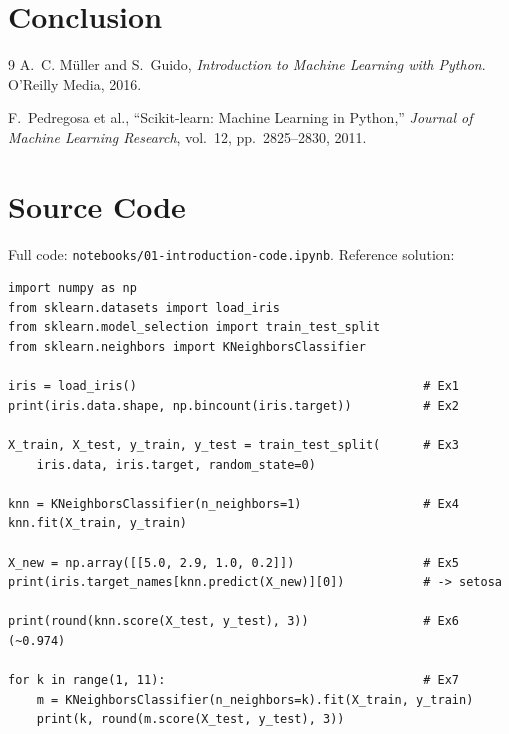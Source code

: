 \documentclass[11pt,a4paper]{article}
\begin{document}
\section{Conclusion}

\begin{thebibliography}{9}
A.~C. M\"uller and S.~Guido,
\emph{Introduction to Machine Learning with Python}.
O'Reilly Media, 2016.

F.~Pedregosa et al.,
``Scikit-learn: Machine Learning in Python,''
\emph{Journal of Machine Learning Research}, vol.~12, pp.~2825--2830, 2011.
\end{thebibliography}

\appendix
\section{Source Code}
Full code: \texttt{notebooks/01-introduction-code.ipynb}. Reference solution:

\begin{lstlisting}[caption={End-to-end reference solution.}]
import numpy as np
from sklearn.datasets import load_iris
from sklearn.model_selection import train_test_split
from sklearn.neighbors import KNeighborsClassifier

iris = load_iris()                                        # Ex1
print(iris.data.shape, np.bincount(iris.target))          # Ex2

X_train, X_test, y_train, y_test = train_test_split(      # Ex3
    iris.data, iris.target, random_state=0)

knn = KNeighborsClassifier(n_neighbors=1)                 # Ex4
knn.fit(X_train, y_train)

X_new = np.array([[5.0, 2.9, 1.0, 0.2]])                  # Ex5
print(iris.target_names[knn.predict(X_new)][0])           # -> setosa

print(round(knn.score(X_test, y_test), 3))                # Ex6  (~0.974)

for k in range(1, 11):                                    # Ex7
    m = KNeighborsClassifier(n_neighbors=k).fit(X_train, y_train)
    print(k, round(m.score(X_test, y_test), 3))
\end{lstlisting}
\end{document}
